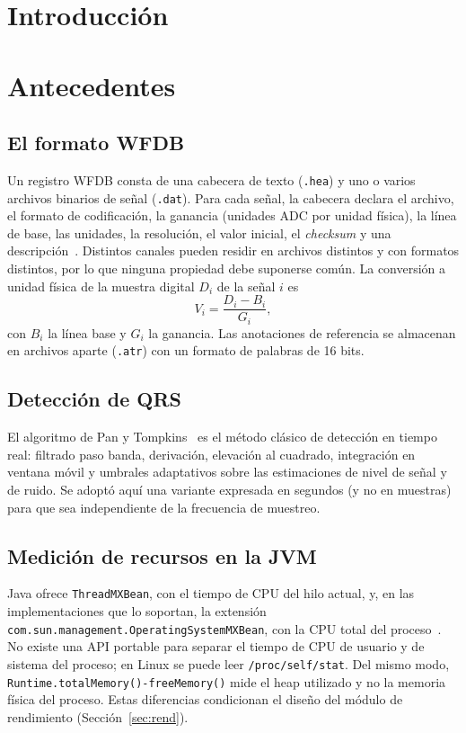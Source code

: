 
\section{Introducción}


\section{Antecedentes}
\subsection{El formato WFDB}
Un registro WFDB consta de una cabecera de texto (\texttt{.hea}) y uno o varios archivos binarios de señal (\texttt{.dat}). Para cada señal, la cabecera declara el archivo, el formato de codificación, la ganancia (unidades ADC por unidad física), la línea de base, las unidades, la resolución, el valor inicial, el \emph{checksum} y una descripción~\cite{wfdb}. Distintos canales pueden residir en archivos distintos y con formatos distintos, por lo que ninguna propiedad debe suponerse común. La conversión a unidad física de la muestra digital $D_i$ de la señal $i$ es
\begin{equation}
V_i=\frac{D_i-B_i}{G_i},
\label{eq:conv}
\end{equation}
con $B_i$ la línea base y $G_i$ la ganancia. Las anotaciones de referencia se almacenan en archivos aparte (\texttt{.atr}) con un formato de palabras de 16 bits.

\subsection{Detección de QRS}
El algoritmo de Pan y Tompkins~\cite{pantompkins1985} es el método clásico de detección en tiempo real: filtrado paso banda, derivación, elevación al cuadrado, integración en ventana móvil y umbrales adaptativos sobre las estimaciones de nivel de señal y de ruido. Se adoptó aquí una variante expresada en segundos (y no en muestras) para que sea independiente de la frecuencia de muestreo.

\subsection{Medición de recursos en la JVM}
Java ofrece \texttt{ThreadMXBean}, con el tiempo de CPU del hilo actual, y, en las implementaciones que lo soportan, la extensión \texttt{com.sun.management.OperatingSystemMXBean}, con la CPU total del proceso~\cite{oraclejmx}. No existe una API portable para separar el tiempo de CPU de usuario y de sistema del proceso; en Linux se puede leer \texttt{/proc/self/stat}. Del mismo modo, \texttt{Runtime.totalMemory()-freeMemory()} mide el heap utilizado y no la memoria física del proceso. Estas diferencias condicionan el diseño del módulo de rendimiento (Sección~\ref{sec:rend}).

